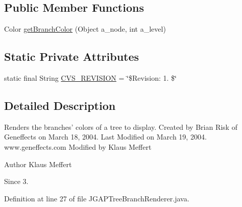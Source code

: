 \subsection*{Public Member Functions}
\begin{DoxyCompactItemize}
\item 
Color \hyperlink{classorg_1_1jgap_1_1gp_1_1impl_1_1_j_g_a_p_tree_branch_renderer_a81f39192508723c69194608c59a65f70}{get\-Branch\-Color} (Object a\-\_\-node, int a\-\_\-level)
\end{DoxyCompactItemize}
\subsection*{Static Private Attributes}
\begin{DoxyCompactItemize}
\item 
static final String \hyperlink{classorg_1_1jgap_1_1gp_1_1impl_1_1_j_g_a_p_tree_branch_renderer_ac29db544681bcc18c056dc3b305a7919}{C\-V\-S\-\_\-\-R\-E\-V\-I\-S\-I\-O\-N} = \char`\"{}\$Revision\-: 1. \$\char`\"{}
\end{DoxyCompactItemize}


\subsection{Detailed Description}
Renders the branches' colors of a tree to display. Created by Brian Risk of Geneffects on March 18, 2004. Last Modified on March 19, 2004. www.\-geneffects.\-com Modified by Klaus Meffert

\begin{DoxyAuthor}{Author}
Klaus Meffert 
\end{DoxyAuthor}
\begin{DoxySince}{Since}
3. 
\end{DoxySince}


Definition at line 27 of file J\-G\-A\-P\-Tree\-Branch\-Renderer.\-java.



